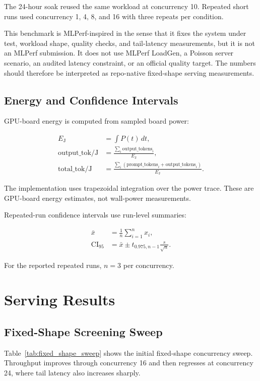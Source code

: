 \documentclass[11pt]{article}
\begin{document}
The 24-hour soak reused the same workload at concurrency 10. Repeated short runs
used concurrency 1, 4, 8, and 16 with three repeats per condition.

This benchmark is MLPerf-inspired in the sense that it fixes the system under
test, workload shape, quality checks, and tail-latency measurements, but it is
not an MLPerf submission. It does not use MLPerf LoadGen, a Poisson server
scenario, an audited latency constraint, or an official quality target. The
numbers should therefore be interpreted as repo-native fixed-shape serving
measurements.

\subsection{Energy and Confidence Intervals}

GPU-board energy is computed from sampled board power:

\begin{align}
E_\mathrm{J} &= \int P(t)\,dt, \\
\mathrm{output\_tok/J} &= \frac{\sum_i \mathrm{output\_tokens}_i}{E_\mathrm{J}}, \\
\mathrm{total\_tok/J} &=
  \frac{\sum_i(\mathrm{prompt\_tokens}_i+\mathrm{output\_tokens}_i)}{E_\mathrm{J}}.
\end{align}

The implementation uses trapezoidal integration over the power trace. These are
GPU-board energy estimates, not wall-power measurements.

Repeated-run confidence intervals use run-level summaries:

\begin{align}
\bar{x} &= \frac{1}{n}\sum_{i=1}^{n}x_i, \\
\mathrm{CI}_{95} &= \bar{x} \pm t_{0.975,n-1}\frac{s}{\sqrt{n}}.
\end{align}

For the reported repeated runs, $n=3$ per concurrency.

\section{Serving Results}

\subsection{Fixed-Shape Screening Sweep}

Table~\ref{tab:fixed_shape_sweep} shows the initial fixed-shape concurrency
sweep. Throughput improves through concurrency 16 and then regresses at
concurrency 24, where tail latency also increases sharply.
\end{document}
